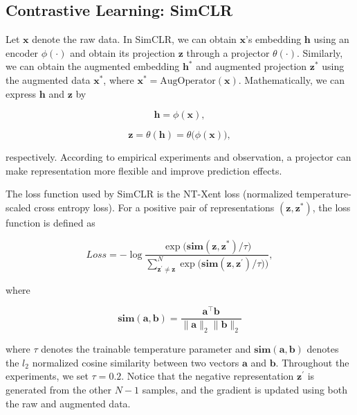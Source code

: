 

\subsection{Contrastive Learning: SimCLR}



Let $\mathbf{x}$ denote the raw data. In SimCLR, we can obtain $\mathbf{x}$'s embedding $\mathbf{h}$ using an encoder $\phi(\cdot)$ and obtain its projection $\mathbf{z}$ through a projector $\theta(\cdot)$. Similarly, we can obtain the augmented embedding $\mathbf{h}^{*}$ and augmented projection $\mathbf{z}^{*}$ using the augmented data $\mathbf{x}^{*}$, where $\mathbf{x}^{*} = \text{AugOperator}(\mathbf{x})$. Mathematically, we can express $\mathbf{h}$ and $\mathbf{z}$ by



\begin{equation}
\mathbf{h}=\phi(\mathbf{x}),
\end{equation}

\begin{equation}
\mathbf{z}=\theta(\mathbf{h})=\theta\Big(\phi(\mathbf{x})\Big), 
\end{equation}

respectively. According to empirical experiments and observation, a projector can make representation more flexible and improve prediction effects.

The loss function used by SimCLR is the NT-Xent loss (normalized temperature-scaled cross entropy loss). For a positive pair of representations $(\mathbf{z},\mathbf{z}^{*})$, the loss function is defined as


\begin{equation}
\mathit{Loss}=-\log\frac{\exp\big(\textbf{sim}(\mathbf{z},\mathbf{z}^{*})/\tau\big)}{\sum^{N}_{\mathbf{z}^{'}\neq\mathbf{z}}\exp\big(\textbf{sim}(\mathbf{z},\mathbf{z}^{'})/\tau)\big)},
\end{equation}

where

\begin{equation}
\textbf{sim}(\mathbf{a},\mathbf{b})=\frac{\mathbf{a}^{\intercal}\mathbf{b}}{\|\mathbf{a}\|_2\|\mathbf{b}\|_2}
\end{equation}

where $\tau$ denotes the trainable temperature parameter and $\textbf{sim}(\mathbf{a},\mathbf{b})$ denotes the $\mathit{l}_2$ normalized cosine similarity between two vectors $\mathbf{a}$ and $\mathbf{b}$. Throughout the experiments, we set $\tau = 0.2$. Notice that the negative representation $\mathbf{z}^{'}$ is generated from the other $N-1$ samples, and the gradient is updated using both the raw and augmented data.

